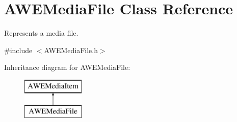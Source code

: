 \hypertarget{class_a_w_e_media_file}{\section{A\-W\-E\-Media\-File Class Reference}
\label{class_a_w_e_media_file}
}


Represents a media file.  




{\ttfamily \#include $<$A\-W\-E\-Media\-File.\-h$>$}

Inheritance diagram for A\-W\-E\-Media\-File\-:\begin{figure}[H]
\begin{center}
\leavevmode
\includegraphics[height=2.000000cm]{class_a_w_e_media_file}
\end{center}
\end{figure}
